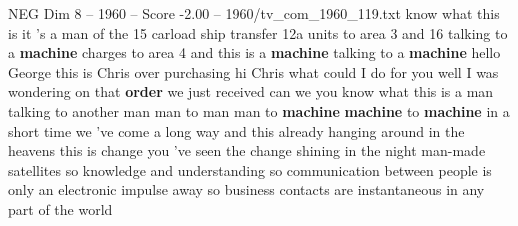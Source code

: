 \begin{textsample}{NEG Dim 8 – 1960 – Score -2.00 – 1960/tv\_com\_1960\_119.txt}  \label{ex:f8_neg_032}
know what this is it 's a man of the 15 carload ship transfer 12a units to area 3 and 16 talking to a \textbf{machine} charges to area 4 and this is a \textbf{machine} talking to a \textbf{machine} hello George this is Chris over purchasing hi Chris what could I do for you well I was wondering on that \textbf{order} we just received can we you know what this is a man talking to another man man to man man to \textbf{machine} \textbf{machine} to \textbf{machine} in a short time we 've come a long way and this already hanging around in the heavens this is change you 've seen the change shining in the night man-made satellites so knowledge and understanding so communication between people is only an electronic impulse away so business contacts are instantaneous in any part of the world

\end{textsample}
